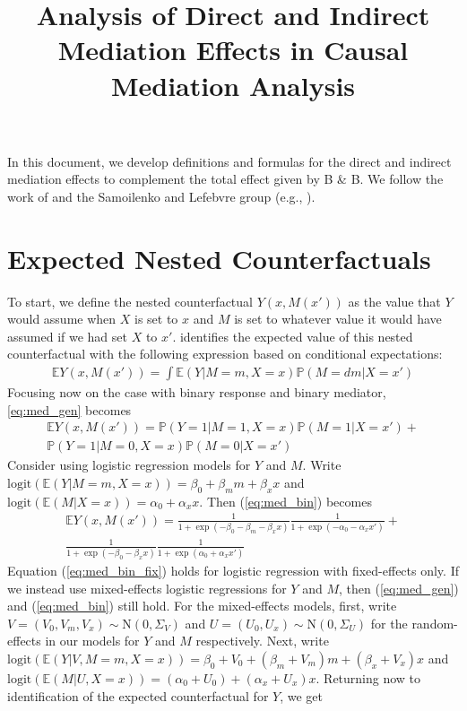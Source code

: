 \documentclass{article}
\title{Analysis of Direct and Indirect Mediation Effects in Causal Mediation Analysis}
\newcommand{\bP}{\mathbb{P}}
\newcommand{\bE}{\mathbb{E}}
\begin{document}
\maketitle

In this document, we develop definitions and formulas for the direct and indirect mediation effects to complement the total effect given by B \& B. We follow the work of \citet{Pea12} and the Samoilenko and Lefebvre group (e.g., \citealp{Sam23}). 

\section{Expected Nested Counterfactuals}
\label{sec:nest_CFs}

To start, we define the nested counterfactual $Y(x, M(x'))$ as the value that $Y$ would assume when $X$ is set to $x$ and $M$ is set to whatever value it would have assumed if we had set $X$ to $x'$. \citet{Pea12} identifies the expected value of this nested counterfactual with the following expression based on conditional expectations:
%
\begin{align}
    \bE Y(x, M(x')) = \int \bE(Y | M=m, X=x) \bP(M = dm | X = x') \label{eq:med_gen}
\end{align}
%
Focusing now on the case with binary response and binary mediator, \ref{eq:med_gen} becomes
%
\begin{multline}
    \bE Y(x, M(x')) = \bP(Y=1 | M=1, X=x) \bP(M=1 | X=x') + \\\bP(Y=1 | M=0, X=x) \bP(M=0 | X=x') \label{eq:med_bin}
\end{multline}
%
Consider using  logistic regression models for $Y$ and $M$. Write $\mathrm{logit}(\bE(Y | M=m, X=x)) = \beta_0 + \beta_m m + \beta_x x$ and $\mathrm{logit}(\bE(M | X=x)) = \alpha_0 + \alpha_x x$. Then (\ref{eq:med_bin}) becomes
%
\begin{multline}
    \bE Y(x, M(x')) = \frac{1}{1 + \exp(-\beta_0 - \beta_m - \beta_x x)} \frac{1}{1 + \exp(-\alpha_0 - \alpha_x x')} +\\
    \frac{1}{1 + \exp(-\beta_0 - \beta_x x)} \frac{1}{1 + \exp(\alpha_0 + \alpha_x x')} \label{eq:med_bin_fix}
\end{multline}
%
Equation (\ref{eq:med_bin_fix}) holds for logistic regression with fixed-effects only. If we instead use  mixed-effects logistic regressions for $Y$ and $M$, then (\ref{eq:med_gen}) and (\ref{eq:med_bin}) still hold. For the mixed-effects models, first, write $V = (V_0, V_m, V_x) \sim \mathrm{N}(0, \Sigma_V)$ and $U = (U_0, U_x) \sim \mathrm{N}(0, \Sigma_U)$ for the random-effects in our models for $Y$ and $M$ respectively. Next, write $\mathrm{logit}(\bE(Y | V, M=m, X=x)) = \beta_0 + V_0 + (\beta_m + V_m) m + (\beta_x + V_x) x$ and $\mathrm{logit}(\bE(M |U, X=x)) = (\alpha_0 + U_0) + (\alpha_x + U_x) x$. Returning now to identification of the expected counterfactual for $Y$, we get
\end{document}
